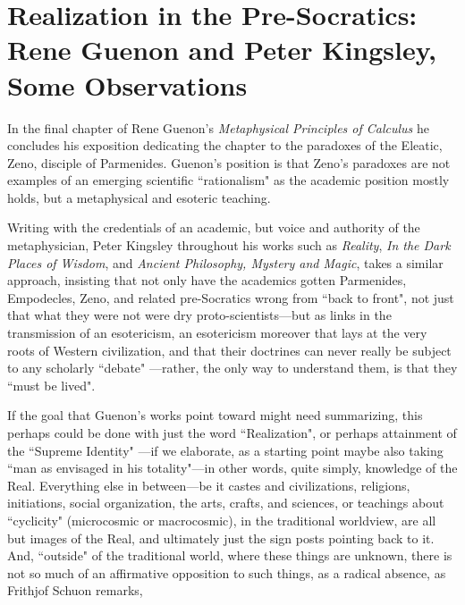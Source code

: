 \section[Realization in the Pre-Socratics]{Realization in the Pre-Socratics: Rene Guenon and Peter Kingsley, Some Observations}

In the final chapter of Rene Guenon's \textit{Metaphysical Principles of Calculus} he concludes his exposition dedicating the chapter to the paradoxes of the Eleatic, Zeno, disciple of Parmenides. Guenon's position is that Zeno's paradoxes are not examples of an emerging scientific ``rationalism" as the academic position mostly holds, but a metaphysical and esoteric teaching.

Writing with the credentials of an academic, but voice and authority of the metaphysician, Peter Kingsley throughout his works such as \textit{Reality}, \textit{In the Dark Places of Wisdom}, and \textit{Ancient Philosophy, Mystery and Magic}, takes a similar approach, insisting that not only have the academics gotten Parmenides, Empodecles, Zeno, and related pre-Socratics wrong from ``back to front", not just that what they were not were dry proto-scientists—but as links in the transmission of an esotericism, an esotericism moreover that lays at the very roots of Western civilization, and that their doctrines can never really be subject to any scholarly ``debate" —rather, the only way to understand them, is that they ``must be lived".

If the goal that Guenon's works point toward might need summarizing, this perhaps could be done with just the word ``Realization", or perhaps attainment of the ``Supreme Identity" —if we elaborate, as a starting point maybe also taking ``man as envisaged in his totality"—in other words, quite simply, knowledge of the Real. Everything else in between—be it castes and civilizations, religions, initiations, social organization, the arts, crafts, and sciences, or teachings about ``cyclicity" (microcosmic or macrocosmic), in the traditional worldview, are all but images of the Real, and ultimately just the sign posts pointing back to it. And, ``outside" of the traditional world, where these things are unknown, there is not so much of an affirmative opposition to such things, as a radical absence, as Frithjof Schuon remarks,

